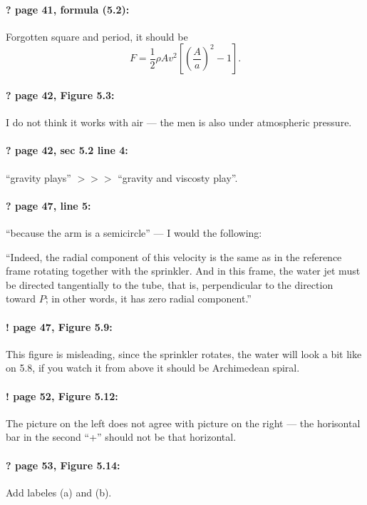 \documentclass[twoside]{article}
\begin{document}
\paragraph{? page 41, formula (5.2):} Forgotten square and period, it should be
\[F = \frac12\rho A v^{2} \left[ \left(\frac{A}{a}\right)^2  - 1 \right].\]

\paragraph{? page 42, Figure 5.3:} I do not think it works with air --- the men is also under atmospheric pressure.

\paragraph{? page 42, sec 5.2 line 4:} ``gravity plays'' $>\!>\!>$ ``gravity and viscosty play''.

\paragraph{? page 47, line 5:} ``because the arm is a semicircle'' --- I would the following:

``Indeed, the radial component of this velocity is the same as in the reference frame rotating together with the sprinkler.
And in this frame, the water jet must be directed tangentially to the tube, that is, perpendicular to the direction toward $P$; in other words, it has zero radial component.''

\paragraph{! page 47, Figure 5.9:} This figure is misleading, since the sprinkler rotates, the water will look a bit like on 5.8, if you watch it from above it should be Archimedean spiral.

\paragraph{! page 52, Figure 5.12:} The picture on the left does not agree with picture on the right --- the horisontal bar in the second ``+'' should not be that horizontal.

\paragraph{? page 53, Figure 5.14:} Add labeles (a) and (b).
\end{document}
